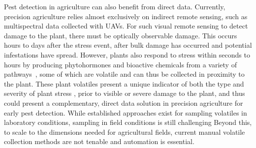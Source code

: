 Pest detection in agriculture can also benefit from direct data. Currently, precision agriculture relies almost exclusively on indirect remote sensing, such as multispectral data collected with UAVs.
For such visual remote sensing to detect damage to the plant, there must be optically observable damage. This occurs hours to days after the stress event, after bulk damage has occurred and potential infestations have spread. However, plants also respond to stress within seconds to hours by producing phytohormones and bioactive chemicals from a variety of pathways~\cite{schuman_layers_2016}, some of which are volatile and can thus be collected in proximity to the plant. These plant volatiles present a unique indicator of both the type and severity of plant stress \cite{howe_plant_2008, dicke_evolutionary_2010}, prior to visible or severe damage to the plant, and thus could present a complementary, direct data solution in precision agriculture for early pest detection. While established approaches exist for sampling volatiles in laboratory conditions, sampling in field conditions is still challenging \cite{lang_ecological_2022,tholl_trends_2021} %
Beyond this, to scale to the dimensions needed for agricultural fields, current manual volatile collection methods are not tenable and automation is essential. 
